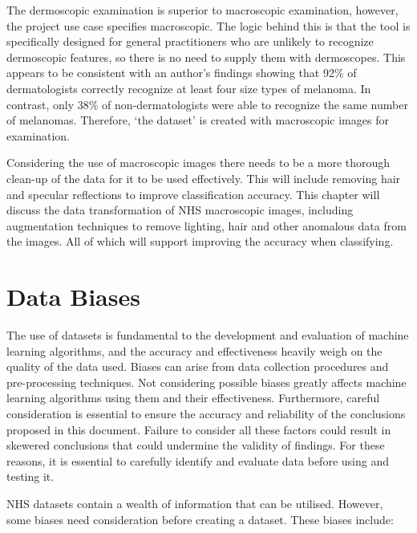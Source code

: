 The dermoscopic examination is superior to macroscopic examination, however, the project use case specifies macroscopic. The logic behind this is that the tool is specifically designed for general practitioners who are unlikely to recognize dermoscopic features, so there is no need to supply them with dermoscopes. This appears to be consistent with an author's findings showing that 92\% of dermatologists correctly recognize at least four size types of melanoma. In contrast, only 38\% of non-dermatologists were able to recognize the same number of melanomas\cite{Tae2019}. Therefore, `the dataset' is created with macroscopic images for examination.

Considering the use of macroscopic images there needs to be a more thorough clean-up of the data for it to be used effectively. This will include removing hair and specular reflections to improve classification accuracy. This chapter will discuss the data transformation of NHS macroscopic images, including augmentation techniques to remove lighting, hair and other anomalous data from the images. All of which will support improving the accuracy when classifying.

\section{Data Biases}
The use of datasets is fundamental to the development and evaluation of machine learning algorithms, and the accuracy and effectiveness heavily weigh on the quality of the data used. Biases can arise from data collection procedures and pre-processing techniques. Not considering possible biases greatly affects machine learning algorithms using them and their effectiveness. Furthermore, careful consideration is essential to ensure the accuracy and reliability of the conclusions proposed in this document. Failure to consider all these factors could result in skewered conclusions that could undermine the validity of findings. For these reasons, it is essential to carefully identify and evaluate data before using and testing it.

NHS datasets contain a wealth of information that can be utilised. However, some biases need consideration before creating a dataset. These biases include:

